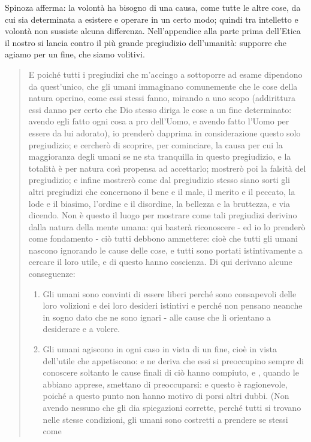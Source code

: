Spinoza afferma: la volontà ha bisogno di una causa, come tutte le altre cose, da cui sia determinata a esistere e operare in un certo modo; quindi tra intelletto e volontà non sussiste alcuna differenza. Nell'appendice alla parte prima dell'Etica il nostro si lancia contro il più grande pregiudizio dell'umanità: supporre che agiamo per un fine, che siamo volitivi.
\begin{quotation}
	\small E poiché
	tutti i pregiudizi che m’accingo a sottoporre ad esame dipendono da quest’unico, che gli
	umani immaginano comunemente che le cose della natura operino, come essi stessi fanno,
	mirando a uno scopo (addirittura essi danno per certo che Dio stesso diriga le cose a un fine determinato: avendo egli fatto ogni cosa a pro dell’Uomo, e avendo fatto l’Uomo per essere da lui adorato), io prenderò dapprima in considerazione questo solo pregiudizio; e cercherò di scoprire, per cominciare, la causa per cui la maggioranza degli umani se ne sta
	tranquilla in questo pregiudizio, e la totalità è per natura così propensa ad accettarlo; mostrerò poi la falsità del pregiudizio; e infine mostrerò come dal pregiudizio stesso
	siano sorti gli altri pregiudizi che concernono il bene e il male, il merito e il peccato, la lode
	e il biasimo, l’ordine e il disordine, la bellezza e la bruttezza, e via dicendo. Non è questo il
	luogo per mostrare come tali pregiudizi derivino dalla natura della mente umana: qui basterà riconoscere - ed io lo prenderò come fondamento - ciò tutti debbono ammettere: cioè
	che tutti gli umani nascono ignorando le cause delle cose, e tutti sono portati istintivamente a cercare il loro utile, e di questo hanno coscienza. Di qui derivano alcune conseguenze:
	\begin{enumerate}
		\item Gli umani sono convinti di essere liberi perché sono consapevoli delle loro volizioni e
		dei loro desideri istintivi e perché non pensano neanche in sogno dato che ne sono ignari -
		alle cause che li orientano a desiderare e a volere.
		\item Gli umani agiscono in ogni caso in vista di un fine, cioè in vista dell’utile che appetiscono: e ne deriva che essi si preoccupino
		sempre di conoscere soltanto le cause finali di ciò hanno compiuto, e , quando le abbiano
		apprese, smettano di preoccuparsi: e questo è ragionevole, poiché a questo punto non hanno motivo di porsi altri dubbi. (Non avendo nessuno che gli dia spiegazioni corrette, perché
		tutti si trovano nelle stesse condizioni, gli umani sono costretti a prendere se stessi come

\end{enumerate}
\end{quotation}

